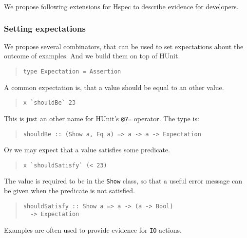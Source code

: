 \documentclass[preprint]{sigplanconf}
\begin{document}
We propose following extensions for Hspec to 
describe evidence for developers.

\subsubsection{Setting expectations}

We propose several combinators, that can be used to set expectations
about the outcome of examples.  And we build them on top of
HUnit.

\begin{quote}\small\begin{verbatim}
type Expectation = Assertion
\end{verbatim}\end{quote}

\noindent A common expectation is, that a value should be equal to an other
value.

\begin{quote}\small\begin{verbatim}
x `shouldBe` 23
\end{verbatim}\end{quote}

\noindent This is just an other name for HUnit's \texttt{@?=}
operator.  The type is:

\begin{quote}\small\begin{verbatim}
shouldBe :: (Show a, Eq a) => a -> a -> Expectation
\end{verbatim}\end{quote}

\noindent Or we may expect that a value satisfies some predicate.

\begin{quote}\small\begin{verbatim}
x `shouldSatisfy` (< 23)
\end{verbatim}\end{quote}

\noindent The value is required to be in the \texttt{Show} class, so that a
useful error message can be given when the predicate is not satisfied.

\begin{quote}\small\begin{verbatim}
shouldSatisfy :: Show a => a -> (a -> Bool)
  -> Expectation
\end{verbatim}\end{quote}

\noindent Examples are often used to provide evidence for {\tt IO}
actions.
\end{document}
